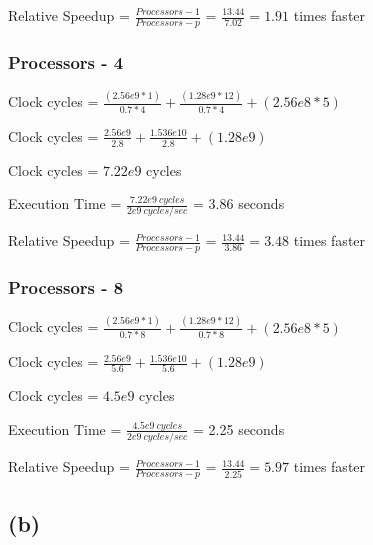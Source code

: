 \documentclass{article}
\begin{document}
    Relative Speedup = $\frac{Processors - 1}{Processors - p}$ = $\frac{13.44}{7.02} = 1.91 $ times faster

    \subsubsection*{Processors - 4}

    Clock cycles = $\frac{(2.56e9 * 1)}{0.7 * 4} + \frac{(1.28e9 * 12)}{0.7*4} + (2.56e8 * 5)$

    \vspace*{6pt}

    Clock cycles = $\frac{2.56e9}{2.8} + \frac{1.536e{10}}{2.8} + (1.28e9) $
    
    \vspace*{6pt}

    Clock cycles = $7.22e9$ cycles
    \vspace*{6pt}
    
    Execution Time = $\frac{7.22e9\ cycles}{2e9\ cycles/sec}$ = 3.86 seconds
    \vspace*{6pt}

    Relative Speedup = $\frac{Processors - 1}{Processors - p}$ = $\frac{13.44}{3.86} = 3.48$ times faster

    \subsubsection*{Processors - 8}

    Clock cycles = $\frac{(2.56e9 * 1)}{0.7 * 8} + \frac{(1.28e9 * 12)}{0.7*8} + (2.56e8 * 5)$

    \vspace*{6pt}

    Clock cycles = $\frac{2.56e9}{5.6} + \frac{1.536e{10}}{5.6} + (1.28e9) $
    
    \vspace*{6pt}

    Clock cycles = $4.5e9$ cycles
    \vspace*{6pt}
    
    Execution Time = $\frac{4.5e9\ cycles}{2e9\ cycles/sec}$ = 2.25 seconds
    \vspace*{6pt}

    Relative Speedup = $\frac{Processors - 1}{Processors - p}$ = $\frac{13.44}{2.25} = 5.97 $ times faster

    \subsection*{(b)}
\end{document}
